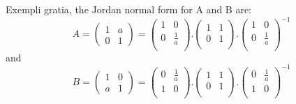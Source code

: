 \documentclass[]{ctexart}
\begin{document}
    Exempli gratia, the Jordan normal form for A and B are:
    \begin{equation*}
    A=
    \begin{pmatrix}
    1 & a\\
    0 & 1
    \end{pmatrix}
    =
    \left(
    \begin{array}{cc}
    1 & 0 \\
    0 & \frac{1}{a} \\
    \end{array}
    \right).\left(
    \begin{array}{cc}
    1 & 1 \\
    0 & 1 \\
    \end{array}
    \right).\left(
    \begin{array}{cc}
    1 & 0 \\
    0 & \frac{1}{a} \\
    \end{array}
    \right)^{-1}
    \end{equation*}
    and
    \begin{equation*}
    	B=
    	\begin{pmatrix}
    	1 & 0\\
    	a & 1
    	\end{pmatrix}
    	=
    	\left(
    	\begin{array}{cc}
    	0 & \frac{1}{a} \\
    	1 & 0 \\
    	\end{array}
    	\right).\left(
    	\begin{array}{cc}
    	1 & 1 \\
    	0 & 1 \\
    	\end{array}
    	\right).\left(
    	\begin{array}{cc}
    	0 & \frac{1}{a} \\
    	1 & 0 \\
    	\end{array}
    	\right)^{-1}
    \end{equation*}
    
\end{document}
